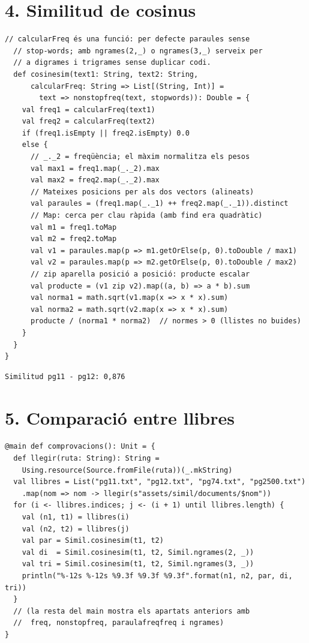 \documentclass[10pt,a4paper,twocolumn]{article}
\begin{document}
\section*{4. Similitud de cosinus}
\begin{lstlisting}[style=scalastyle]
  // calcularFreq és una funció: per defecte paraules sense
  // stop-words; amb ngrames(2,_) o ngrames(3,_) serveix per
  // a digrames i trigrames sense duplicar codi.
  def cosinesim(text1: String, text2: String,
      calcularFreq: String => List[(String, Int)] =
        text => nonstopfreq(text, stopwords)): Double = {
    val freq1 = calcularFreq(text1)
    val freq2 = calcularFreq(text2)
    if (freq1.isEmpty || freq2.isEmpty) 0.0
    else {
      // _._2 = freqüència; el màxim normalitza els pesos
      val max1 = freq1.map(_._2).max
      val max2 = freq2.map(_._2).max
      // Mateixes posicions per als dos vectors (alineats)
      val paraules = (freq1.map(_._1) ++ freq2.map(_._1)).distinct
      // Map: cerca per clau ràpida (amb find era quadràtic)
      val m1 = freq1.toMap
      val m2 = freq2.toMap
      val v1 = paraules.map(p => m1.getOrElse(p, 0).toDouble / max1)
      val v2 = paraules.map(p => m2.getOrElse(p, 0).toDouble / max2)
      // zip aparella posició a posició: producte escalar
      val producte = (v1 zip v2).map((a, b) => a * b).sum
      val norma1 = math.sqrt(v1.map(x => x * x).sum)
      val norma2 = math.sqrt(v2.map(x => x * x).sum)
      producte / (norma1 * norma2)  // normes > 0 (llistes no buides)
    }
  }
}
\end{lstlisting}
\begin{lstlisting}[style=outputstyle]
Similitud pg11 - pg12: 0,876
\end{lstlisting}

\section*{5. Comparació entre llibres}
\begin{lstlisting}[style=scalastyle]
@main def comprovacions(): Unit = {
  def llegir(ruta: String): String =
    Using.resource(Source.fromFile(ruta))(_.mkString)
  val llibres = List("pg11.txt", "pg12.txt", "pg74.txt", "pg2500.txt")
    .map(nom => nom -> llegir(s"assets/simil/documents/$nom"))
  for (i <- llibres.indices; j <- (i + 1) until llibres.length) {
    val (n1, t1) = llibres(i)
    val (n2, t2) = llibres(j)
    val par = Simil.cosinesim(t1, t2)
    val di  = Simil.cosinesim(t1, t2, Simil.ngrames(2, _))
    val tri = Simil.cosinesim(t1, t2, Simil.ngrames(3, _))
    println("%-12s %-12s %9.3f %9.3f %9.3f".format(n1, n2, par, di, tri))
  }
  // (la resta del main mostra els apartats anteriors amb
  //  freq, nonstopfreq, paraulafreqfreq i ngrames)
}
\end{lstlisting}
\end{document}
